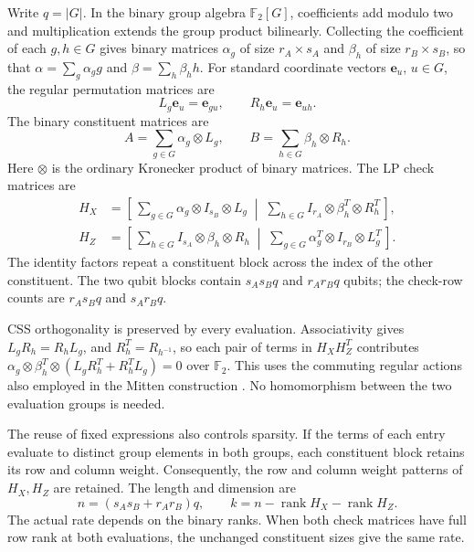 \documentclass[12pt]{article}
\newcommand{\F}{\mathbb F_2}
\newcommand{\rk}{\operatorname{rank}}
\begin{document}
Write $q=|G|$. In the binary group algebra $\F[G]$, coefficients add
modulo two and multiplication extends the group product bilinearly.
Collecting the coefficient of each $g,h\in G$ gives binary matrices
$\alpha_g$ of size $r_A\times s_A$ and $\beta_h$ of size
$r_B\times s_B$, so that $\alpha=\sum_g\alpha_g g$ and
$\beta=\sum_h\beta_h h$. For standard coordinate vectors $\mathbf e_u$,
$u\in G$, the regular permutation matrices are
\begin{equation}
 L_g\mathbf e_u=\mathbf e_{gu},\qquad R_h\mathbf e_u=\mathbf e_{uh}.
 \label{eq:regular}
\end{equation}
The binary constituent matrices are
\begin{equation}
 A=\sum_{g\in G}\alpha_g\otimes L_g,\qquad
 B=\sum_{h\in G}\beta_h\otimes R_h.
 \label{eq:constituents}
\end{equation}
Here $\otimes$ is the ordinary Kronecker product of binary matrices.
The LP check matrices \cite[Sec.~III]{lp} are
\begin{align}
 H_X&=\left[\,
 \sum_{g\in G}\alpha_g\otimes I_{s_B}\otimes L_g
 \;\middle|\;
 \sum_{h\in G}I_{r_A}\otimes\beta_h^T\otimes R_h^T
 \,\right],\label{eq:hx}\\
 H_Z&=\left[\,
 \sum_{h\in G}I_{s_A}\otimes\beta_h\otimes R_h
 \;\middle|\;
 \sum_{g\in G}\alpha_g^T\otimes I_{r_B}\otimes L_g^T
 \,\right].\label{eq:hz}
\end{align}
The identity factors repeat a constituent block across the index of the
other constituent. The two qubit blocks contain $s_As_Bq$ and $r_Ar_Bq$
qubits; the check-row counts are $r_As_Bq$ and $s_Ar_Bq$.

CSS orthogonality is preserved by every evaluation. Associativity gives
$L_gR_h=R_hL_g$, and $R_h^T=R_{h^{-1}}$, so each pair of terms in
$H_XH_Z^T$ contributes
$\alpha_g\otimes\beta_h^T\otimes
(L_gR_h^T+R_h^TL_g)=0$ over $\F$.
This uses the commuting regular actions also employed in the Mitten
construction \cite[Appendix A.B--C]{mitten}.
No homomorphism between the two evaluation groups is needed.

The reuse of fixed expressions also controls sparsity. If the terms of
each entry evaluate to distinct group elements in both groups, each
constituent block retains its row and column weight. Consequently, the
row and column weight patterns of $H_X,H_Z$ are retained.
The length and dimension are
\begin{equation}
 n=(s_As_B+r_Ar_B)q,\qquad
 k=n-\rk H_X-\rk H_Z.\label{eq:rate}
\end{equation}
The actual rate depends on the binary ranks. When both check matrices
have full row rank at both evaluations, the unchanged constituent sizes
give the same rate.
\end{document}
